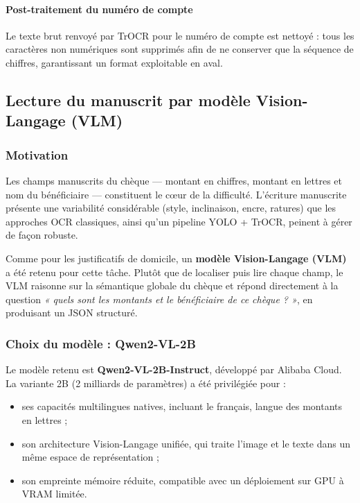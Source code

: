 \paragraph{Post-traitement du numéro de compte}

Le texte brut renvoyé par TrOCR pour le numéro de compte est nettoyé : tous
les caractères non numériques sont supprimés afin de ne conserver que la
séquence de chiffres, garantissant un format exploitable en aval.

\subsection*{Lecture du manuscrit par modèle Vision-Langage (VLM)}

\subsubsection{Motivation}

Les champs manuscrits du chèque — montant en chiffres, montant en lettres
et nom du bénéficiaire — constituent le cœur de la difficulté. L'écriture
manuscrite présente une variabilité considérable (style, inclinaison,
encre, ratures) que les approches OCR classiques, ainsi qu'un pipeline
YOLO + TrOCR, peinent à gérer de façon robuste.

Comme pour les justificatifs de domicile, un \textbf{modèle Vision-Langage
(VLM)} a été retenu pour cette tâche. Plutôt que de localiser puis lire
chaque champ, le VLM raisonne sur la sémantique globale du chèque et répond
directement à la question \textit{« quels sont les montants et le
bénéficiaire de ce chèque ? »}, en produisant un JSON structuré.

\subsubsection{Choix du modèle : Qwen2-VL-2B}

Le modèle retenu est \textbf{Qwen2-VL-2B-Instruct}, développé par Alibaba
Cloud. La variante 2B (2 milliards de paramètres) a été privilégiée pour :
\begin{itemize}
    \item ses capacités multilingues natives, incluant le français, langue
    des montants en lettres ;
    \item son architecture Vision-Langage unifiée, qui traite l'image et le
    texte dans un même espace de représentation ;
    \item son empreinte mémoire réduite, compatible avec un déploiement sur
    GPU à VRAM limitée.
\end{itemize}

